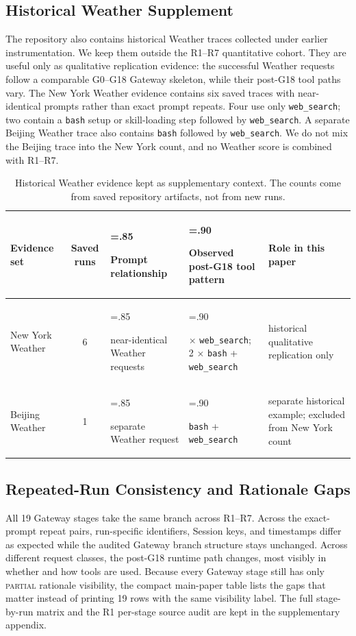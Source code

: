 \documentclass[11pt,a4paper]{article}
\begin{document}
\subsection{Historical Weather Supplement}
\label{sec:historical-weather}

The repository also contains historical Weather traces collected under
earlier instrumentation. We keep them outside the R1--R7 quantitative
cohort. They are useful only as qualitative replication evidence: the
successful Weather requests follow a comparable G0--G18 Gateway skeleton,
while their post-G18 tool paths vary. The New York Weather evidence
contains six saved traces with near-identical prompts rather than exact
prompt repeats. Four use only \texttt{web\_search}; two contain a
\texttt{bash} setup or skill-loading step followed by \texttt{web\_search}.
A separate Beijing Weather trace also contains \texttt{bash} followed by
\texttt{web\_search}. We do not mix the Beijing trace into the New York
count, and no Weather score is combined with R1--R7.

\begin{table}[H]
\centering
\caption{Historical Weather evidence kept as supplementary context. The
counts come from saved repository artifacts, not from new runs.}
\label{tab:historical-weather}
{\scriptsize
\begin{tabularx}{\linewidth}{@{}>{\raggedright\arraybackslash}p{.16\linewidth} c >{\hsize=.85\hsize\raggedright\arraybackslash}X >{\hsize=.90\hsize\raggedright\arraybackslash}X >{\hsize=1.25\hsize\raggedright\arraybackslash}X@{}}
\toprule
Evidence set & Saved runs & Prompt relationship & Observed post-G18 tool pattern & Role in this paper \\
\midrule
New York Weather & 6 & near-identical Weather requests & 4 \(\times\) \texttt{web\_search}; 2 \(\times\) \texttt{bash} + \texttt{web\_search} & historical qualitative replication only \\
Beijing Weather & 1 & separate Weather request & \texttt{bash} + \texttt{web\_search} & separate historical example; excluded from New York count \\
\bottomrule
\end{tabularx}
}
\end{table}

\subsection{Repeated-Run Consistency and Rationale Gaps}

All 19 Gateway stages take the same branch across R1--R7. Across the
exact-prompt repeat pairs, run-specific identifiers, Session keys, and
timestamps differ as expected while the audited Gateway branch structure
stays unchanged. Across different request classes, the post-G18 runtime
path changes, most visibly in whether and how tools are used. Because
every Gateway stage still has only \textsc{partial} rationale visibility,
the compact main-paper table lists the gaps that matter instead of
printing 19 rows with the same visibility label. The full stage-by-run
matrix and the R1 per-stage source audit are kept in the supplementary
appendix.
\end{document}
